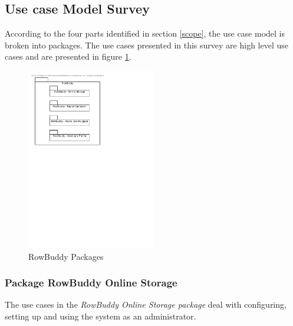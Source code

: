 	
	\subsection{Use case Model Survey}
	According to the four parts identified in section \ref{scope}, the use case model is broken into packages. The use cases presented in this survey are high level use cases and are presented in figure \ref{img:rowbuddyPackages}.
	
	\begin{figure}[H]
		\begin{center}
			\includegraphics[width=0.5\textwidth]{./figures/rowbuddy_packages.pdf}
			\caption{RowBuddy Packages}
			\label{img:rowbuddyPackages}
		\end{center}
	\end{figure}
	
	
	
		\subsubsection{Package RowBuddy Online Storage}
		The use cases in the \textit{RowBuddy Online Storage package} deal with configuring, setting up and using the system as an administrator.\\
	
